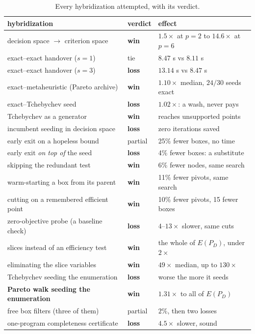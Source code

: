 \documentclass[11pt,a4paper]{article}
\newcommand{\Dset}{D}
\newcommand{\E}{E(P_{\Dset})}
\begin{document}
\begin{table}[h]
\centering
\caption{Every hybridization attempted, with its verdict.}
\begin{tabular}{lll}
\toprule
hybridization & verdict & effect \\
\midrule
decision space $\to$ criterion space & \textbf{win} & $1.5\times$ at $p=2$ to $14.6\times$ at $p=6$ \\
exact--exact handover ($s=1$)        & tie          & $8.47$ s vs $8.11$ s \\
exact--exact handover ($s=3$)        & \textbf{loss} & $13.14$ s vs $8.47$ s \\
exact--metaheuristic (Pareto archive) & \textbf{win} & $1.10\times$ median, $24/30$ seeds exact \\
exact--Tchebychev seed               & \textbf{loss} & $1.02\times$: a wash, never pays \\
Tchebychev as a generator            & \textbf{win} & reaches unsupported points \\
incumbent seeding in decision space  & \textbf{loss} & zero iterations saved \\
early exit on a hopeless bound       & partial      & 25\% fewer boxes, no time \\
early exit \emph{on top of} the seed  & \textbf{loss} & 4\% fewer boxes: a substitute \\
skipping the redundant test          & \textbf{win} & 6\% fewer nodes, same search \\
warm-starting a box from its parent  & \textbf{win} & 11\% fewer pivots, same search \\
cutting on a remembered efficient point & \textbf{win} & 10\% fewer pivots, 15 fewer boxes \\
zero-objective probe (a baseline check) & \textbf{loss} & $4$--$13\times$ slower, same cuts \\
slices instead of an efficiency test    & \textbf{win} & the whole of $\E$, under $2\times$ \\
eliminating the slice variables        & \textbf{win} & $49\times$ median, up to $130\times$ \\
Tchebychev seeding the enumeration     & \textbf{loss} & worse the more it seeds \\
\textbf{Pareto walk seeding the enumeration} & \textbf{win} & $\mathbf{1.31\times}$ to all of $\E$ \\
free box filters (three of them)       & partial      & $2\%$, then two losses \\
one-program completeness certificate   & \textbf{loss} & $4.5\times$ slower, sound \\
\bottomrule
\end{tabular}
\end{table}
\end{document}

